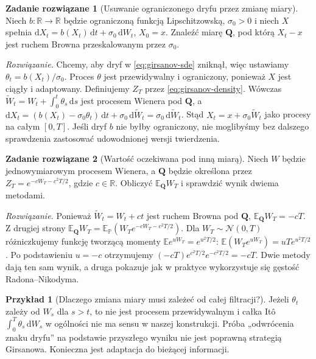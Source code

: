 \documentclass[11pt,a4paper,oneside]{report}
\numberwithin{equation}{chapter}
\theoremstyle{plain}
\theoremstyle{definition}
\newtheorem{przyklad}{Przykład}[chapter]
\newtheorem{zadanie}{Zadanie rozwiązane}[chapter]
\theoremstyle{remark}
\newcommand{\R}{\mathbb{R}}
\newcommand{\Prob}{\mathbb{P}}
\newcommand{\E}{\mathbb{E}}
\newcommand{\dd}{\mathrm{d}}
\newcommand{\Normal}{\mathcal{N}}
\begin{document}
\begin{zadanie}[Usuwanie ograniczonego dryfu przez zmianę miary]
Niech $b:\R\to\R$ będzie ograniczoną funkcją Lipschitzowską,
$\sigma_0>0$ i niech $X$ spełnia
$\dd X_t=b(X_t)\,\dd t+\sigma_0\,\dd W_t$, $X_0=x$.
Znaleźć miarę $\mathbf Q$, pod którą $X_t-x$
jest ruchem Browna przeskalowanym przez $\sigma_0$.

\emph{Rozwiązanie.} Chcemy, aby dryf w
\eqref{eq:girsanov-sde} zniknął, więc ustawiamy
$\theta_t=b(X_t)/\sigma_0$.
Proces $\theta$ jest przewidywalny i ograniczony,
ponieważ $X$ jest ciągły i adaptowany. Definiujemy
$Z_T$ przez \eqref{eq:girsanov-density}. Wówczas
$\widetilde W_t=W_t+\int_0^t\theta_s\,\dd s$ jest procesem
Wienera pod $\mathbf Q$, a
$\dd X_t=(b(X_t)-\sigma_0\theta_t)\,\dd t
+\sigma_0\,\dd\widetilde W_t=\sigma_0\,\dd\widetilde W_t$.
Stąd $X_t=x+\sigma_0\widetilde W_t$ jako procesy
na całym $[0,T]$. Jeśli dryf $b$ nie byłby ograniczony,
nie moglibyśmy bez dalszego sprawdzenia zastosować
udowodnionej wersji twierdzenia.
\end{zadanie}

\begin{zadanie}[Wartość oczekiwana pod inną miarą]
Niech $W$ będzie jednowymiarowym procesem Wienera,
a $\mathbf Q$ będzie określona przez
$Z_T=e^{-cW_T-c^2T/2}$, gdzie $c\in\R$.
Obliczyć $\E_{\mathbf Q}W_T$ i sprawdzić wynik
dwiema metodami.

\emph{Rozwiązanie.} Ponieważ $\widetilde W_t=W_t+ct$
jest ruchem Browna pod $\mathbf Q$,
$\E_{\mathbf Q}W_T=-cT$.
Z drugiej strony
$\E_{\mathbf Q}W_T=\E_{\Prob}(W_Te^{-cW_T-c^2T/2})$.
Dla $W_T\sim\Normal(0,T)$ różniczkujemy funkcję
tworzącą momenty $\E e^{uW_T}=e^{u^2T/2}$:
$\E(W_Te^{uW_T})=uT e^{u^2T/2}$.
Po podstawieniu $u=-c$ otrzymujemy
$(-cT)e^{c^2T/2}e^{-c^2T/2}=-cT$.
Dwie metody dają ten sam wynik, a druga pokazuje
jak w praktyce wykorzystuje się gęstość Radona--Nikodyma.
\end{zadanie}

\begin{przyklad}[Dlaczego zmiana miary musi zależeć od całej filtracji?]
Jeżeli $\theta_t$ zależy od $W_s$ dla $s>t$, to nie
jest procesem przewidywalnym i całka Itô
$\int_0^T\theta_s\,\dd W_s$ w ogólności nie ma sensu w
naszej konstrukcji. Próba „odwrócenia znaku dryfu”
na podstawie przyszłego wyniku nie jest poprawną
strategią Girsanowa. Konieczna jest adaptacja
do bieżącej informacji.
\end{przyklad}
\end{document}
